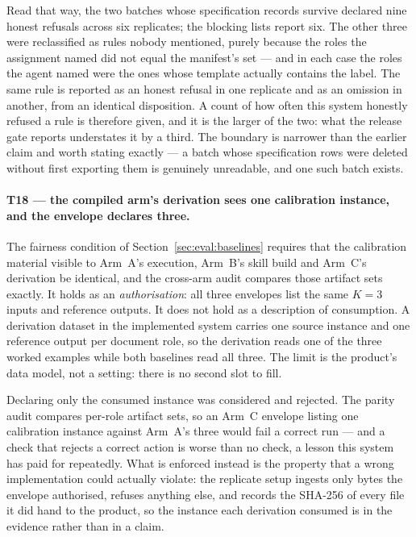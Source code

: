 Read that way, the two batches whose specification records survive declared nine honest
refusals across six replicates; the blocking lists report six. The other three were reclassified
as rules nobody mentioned, purely because the roles the assignment named did not equal the
manifest's set --- and in each case the roles the agent named were the ones whose template
actually contains the label. The same rule is reported as an honest refusal in one replicate and
as an omission in another, from an identical disposition. A count of how often this system
honestly refused a rule is therefore given, and it is the larger of the two: what the release
gate reports understates it by a third. The boundary is narrower than the earlier claim and
worth stating exactly --- a batch whose specification rows were deleted without first exporting
them is genuinely unreadable, and one such batch exists.

\paragraph{T18 --- the compiled arm's derivation sees one calibration instance, and the
envelope declares three.}
The fairness condition of Section~\ref{sec:eval:baselines} requires that the calibration material
visible to Arm~A's execution, Arm~B's skill build and Arm~C's derivation be identical, and the
cross-arm audit compares those artifact sets exactly. It holds as an \emph{authorisation}: all
three envelopes list the same $K=3$ inputs and reference outputs. It does not hold as a
description of consumption. A derivation dataset in the implemented system carries one source
instance and one reference output per document role, so the derivation reads one of the three
worked examples while both baselines read all three. The limit is the product's data model,
not a setting: there is no second slot to fill.

Declaring only the consumed instance was considered and rejected. The parity audit compares
per-role artifact sets, so an Arm~C envelope listing one calibration instance against Arm~A's
three would fail a correct run --- and a check that rejects a correct action is worse than no
check, a lesson this system has paid for repeatedly. What is enforced instead is the property
that a wrong implementation could actually violate: the replicate setup ingests only bytes the
envelope authorised, refuses anything else, and records the SHA-256 of every file it did hand
to the product, so the instance each derivation consumed is in the evidence rather than in a
claim.

